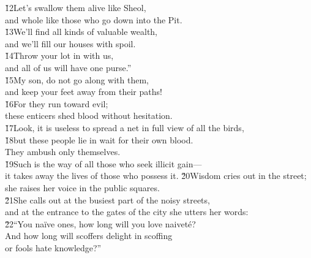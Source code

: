 \begin{poetry}
\poeml \v{12}Let's swallow them alive like Sheol, \\
\poemll    and whole like those who go down into the Pit. \\
\poeml \v{13}We'll find all kinds of valuable wealth, \\
\poemll    and we'll fill our houses with spoil. \\
\poeml \v{14}Throw your lot in with us, \\
\poemll    and all of us will have one purse.'' \\
\poeml \v{15}My son, do not go along with them, \\
\poemll    and keep your feet away from their paths! \\
\poeml \v{16}For they run toward evil; \\
\poemll    these enticers shed blood without hesitation. \\
\poeml \v{17}Look, it is useless to spread a net in full view of all the birds, \\
\poeml \v{18}but these people lie in wait for their own blood. \\
\poemlll       They ambush only themselves. \\
\poeml \v{19}Such is the way of all those who seek illicit gain--- \\
\poemll    it takes away the lives of those who possess it.
\poeml \v{20}Wisdom cries out in the street; \\
\poemll    she raises her voice in the public squares. \\
\poeml \v{21}She calls out at the busiest part of the noisy streets, \\
\poemll    and at the entrance to the gates of the city she utters her words: \\
\poeml \v{22}``You na\"{i}ve ones, how long will you love naivet\'{e}? \\
\poemll    And how long will scoffers delight in scoffing \\
\poemlll       or fools hate knowledge?'' \\

\end{poetry}
